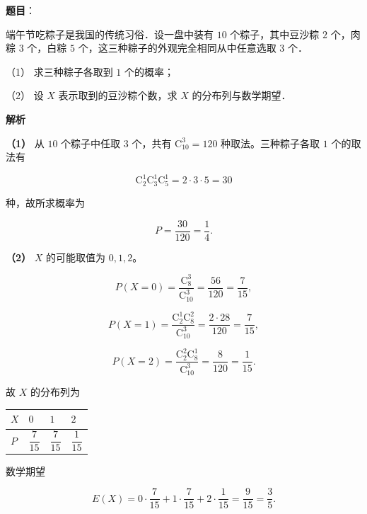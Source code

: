 \begin{answer}

\textbf{题目}：

端午节吃粽子是我国的传统习俗．设一盘中装有 $10$ 个粽子，其中豆沙粽 $2$ 个，肉粽 $3$ 个，白粽 $5$ 个，这三种粽子的外观完全相同从中任意选取 $3$ 个．

（1） 求三种粽子各取到 $1$ 个的概率；

（2） 设 $X$ 表示取到的豆沙粽个数，求 $X$ 的分布列与数学期望．

\textbf{解析}

\textbf{（1）} 从 $10$ 个粽子中任取 $3$ 个，共有 $\mathrm{C}_{10}^{3}=120$ 种取法。三种粽子各取 $1$ 个的取法有

\nopagebreak[4]
\[
\mathrm{C}_{2}^{1}\mathrm{C}_{3}^{1}\mathrm{C}_{5}^{1}=2\cdot 3\cdot 5=30
\]

种，故所求概率为

\nopagebreak[4]
\[
P=\frac{30}{120}=\frac{1}{4}.
\]

\textbf{（2）} $X$ 的可能取值为 $0,1,2$。

\nopagebreak[4]
\[
P(X=0)=\frac{\mathrm{C}_{8}^{3}}{\mathrm{C}_{10}^{3}}=\frac{56}{120}=\frac{7}{15},
\]

\nopagebreak[4]
\[
P(X=1)=\frac{\mathrm{C}_{2}^{1}\mathrm{C}_{8}^{2}}{\mathrm{C}_{10}^{3}}
=\frac{2\cdot 28}{120}=\frac{7}{15},
\]

\nopagebreak[4]
\[
P(X=2)=\frac{\mathrm{C}_{2}^{2}\mathrm{C}_{8}^{1}}{\mathrm{C}_{10}^{3}}
=\frac{8}{120}=\frac{1}{15}.
\]

故 $X$ 的分布列为

\begin{center}
\begin{tabular}{llll}
\toprule
$X$ & $0$ & $1$ & $2$ \\
\midrule
$P$ & $\dfrac{7}{15}$ & $\dfrac{7}{15}$ & $\dfrac{1}{15}$ \\
\bottomrule
\end{tabular}
\end{center}

数学期望

\nopagebreak[4]
\[
E(X)=0\cdot\frac{7}{15}+1\cdot\frac{7}{15}+2\cdot\frac{1}{15}
=\frac{9}{15}=\frac{3}{5}.
\]



\end{answer}
